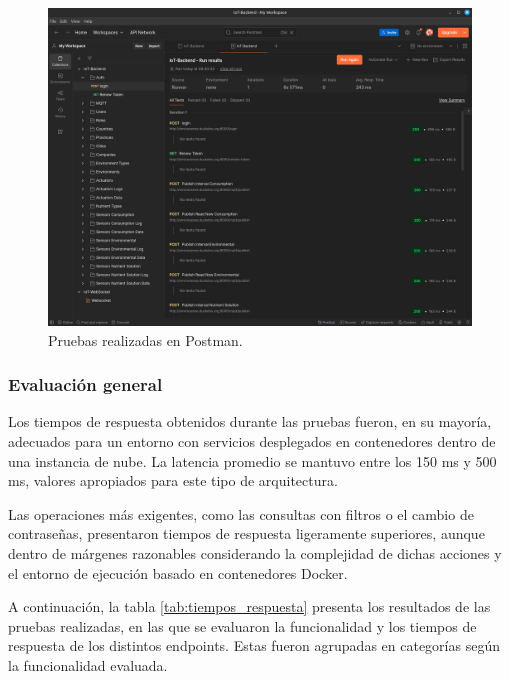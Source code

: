 \begin{figure}[H]
    \centering
    \includegraphics[width=\textwidth]{Images/38_postman.png}
    \caption[Pruebas realizadas en Postman]{Pruebas realizadas en Postman.}
    \label{fig:postman}
\end{figure}

\subsubsection{Evaluación general}

Los tiempos de respuesta obtenidos durante las pruebas fueron, en su mayoría,
adecuados para un entorno con servicios desplegados en contenedores dentro de
una instancia de nube. La latencia promedio se mantuvo entre los 150 ms y 500
ms, valores apropiados para este tipo de arquitectura.

Las operaciones más exigentes, como las consultas con filtros o el cambio de
contraseñas, presentaron tiempos de respuesta ligeramente superiores, aunque
dentro de márgenes razonables considerando la complejidad de dichas acciones y
el entorno de ejecución basado en contenedores Docker.

A continuación, la tabla \ref{tab:tiempos_respuesta} presenta los resultados de
las pruebas realizadas, en las que se evaluaron la funcionalidad y los tiempos
de respuesta de los distintos endpoints. Estas fueron agrupadas en categorías
según la funcionalidad evaluada.

